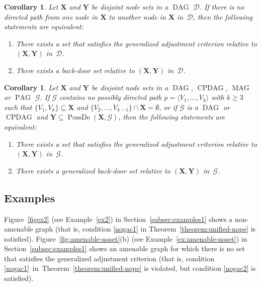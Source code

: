 \documentclass[11pt,a4paper]{article}
\newtheorem{corollary}[definition]{Corollary}
\DeclareMathOperator{\CPDAG}{CPDAG}
\DeclareMathOperator{\DAG}{DAG}
\DeclareMathOperator{\MAG}{MAG}
\DeclareMathOperator{\PAG}{PAG}
\DeclareMathOperator{\PossDe}{PossDe}
\newcommand{\g}[1][G]{\mathcal{#1}}
\begin{document}
\begin{corollary}
Let $\mathbf{X}$ and $\mathbf{Y}$ be disjoint node sets in a $\DAG$ $\g[D]$. If there is no directed path from one node in $\mathbf{X}$ to another node in $\mathbf{X}$ in~$\g[D]$, then the following statements are equivalent:
\begin{enumerate}[label=(\roman*)]
\item\label{l2:1} There exists a set that satisfies the generalized adjustment criterion relative to $(\mathbf{X,Y})$ in~$\g[D]$.
\item\label{l2:2} There exists a back-door set relative to $(\mathbf{X,Y})$ in~$\g[D]$.
\end{enumerate}
\label{cor:equivalence gac bc}
\end{corollary}
\begin{corollary}
Let $\mathbf{X}$ and $\mathbf{Y}$ be disjoint node sets in a $\DAG$, $\CPDAG$, $\MAG$ or $\PAG$ $\g$. If $\g$ contains no possibly directed path $p = \langle V_1, \dots ,V_k \rangle$ with $k \ge 3$ such that $ \{V_{1},V_{k}\} \subseteq \mathbf{X}$ and $\{V_{2}, \dots ,V_{k-1}\} \cap \mathbf{X} = \emptyset$, or if $\g$ is a $\DAG$ or $\CPDAG$ and $\mathbf{Y} \subseteq \PossDe(\mathbf{X},\g)$, then the following statements are equivalent:
\begin{enumerate}[label=(\roman*)]
\item\label{l:1} There exists a set that satisfies the generalized adjustment criterion relative to $(\mathbf{X,Y})$ in~$\g$.
\item\label{l:2} There exists a generalized back-door set relative to $(\mathbf{X,Y})$ in~$\g$.
\end{enumerate}
\label{cor:equivalence gac gbc}
\end{corollary}

\subsection{Examples} \label{subsec:ex3}

Figure~\ref{figex2} (see Example~\ref{ex2}) in Section~\ref{subsec:examples1} shows a non-amenable graph (that is, condition \ref{nogac1} in Theorem~\ref{theorem:unified-nope} is satisfied).
Figure~\ref{fig:amenable-noset}(b) (see Example~\ref{ex:amenable-noset}) in Section~\ref{subsec:examples1} shows an amenable graph for which there is no set that satisfies the generalized adjustment criterion (that is, condition \ref{nogac1}~in~Theorem~\ref{theorem:unified-nope} is violated, but condition \ref{nogac2} is satisfied).
\end{document}

